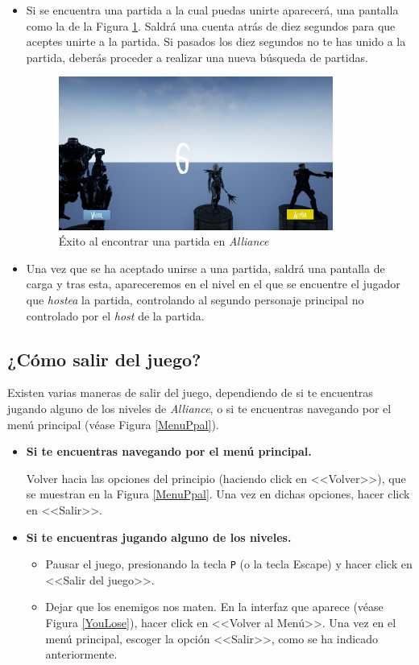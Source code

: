 \begin{itemize}
\item Si se encuentra una partida a la cual puedas unirte aparecerá, una pantalla como la de la Figura \ref{Success}. Saldrá una cuenta atrás de diez segundos para que aceptes unirte a la partida. Si pasados los diez segundos no te has unido a la partida, deberás proceder a realizar una nueva búsqueda de partidas.

\begin{figure}[H]
  \centering
  \includegraphics[width=9cm]{./images/Success.png}
  \caption{Éxito al encontrar una partida en \textit{Alliance}}
  \label{Success}
\end{figure}

\item Una vez que se ha aceptado unirse a una partida, saldrá una pantalla de carga y tras esta, apareceremos en el nivel en el que se encuentre el jugador que \textit{hostea} la partida, controlando al segundo personaje principal no controlado por el \textit{host} de la partida.
\end{itemize}


\subsection{¿Cómo salir del juego?}

Existen varias maneras de salir del juego, dependiendo de si te encuentras jugando alguno de los niveles de \textit{Alliance}, o si te encuentras navegando por el menú principal (véase Figura \ref{MenuPpal}).

\begin{itemize}
\item \textbf{Si te encuentras navegando por el menú principal.}

Volver hacia las opciones del principio (haciendo click en <<Volver>>), que se muestran en la Figura \ref{MenuPpal}. Una vez en dichas opciones, hacer click en <<Salir>>.

\item \textbf{Si te encuentras jugando alguno de los niveles.}

\begin{itemize}
\item Pausar el juego, presionando la tecla \texttt{P} (o la tecla Escape) y hacer click en <<Salir del juego>>.
\item Dejar que los enemigos nos maten. En la interfaz que aparece (véase Figura \ref{YouLose}), hacer click en <<Volver al Menú>>. Una vez en el menú principal, escoger la opción <<Salir>>, como se ha indicado anteriormente. 
\end{itemize}
\end{itemize}

